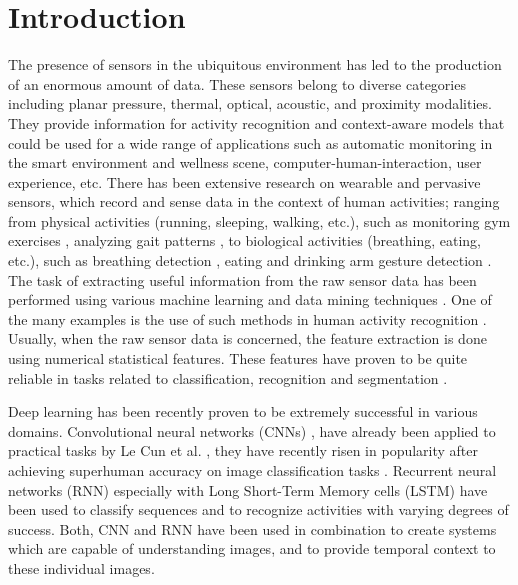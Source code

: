 \section{Introduction}
The presence of sensors in the ubiquitous environment has led to the production of an enormous amount of data. These sensors belong to diverse categories including planar pressure, thermal, optical, acoustic, and proximity modalities. 
They provide information for activity recognition and context-aware models that could be used for a wide range of applications such as automatic monitoring in the smart environment and wellness scene, computer-human-interaction, user experience, etc. 
There has been extensive research on wearable and pervasive sensors, which record and sense data in the context of human activities; ranging from physical activities (running, sleeping, walking, etc.), such as  monitoring gym exercises \cite{zhou2016never}, analyzing gait patterns \cite{tao2012gait}, to biological activities (breathing, eating, etc.), such as breathing detection \cite{corbishley2008breathing}, eating \cite{cheng2010active} and drinking arm gesture detection \cite{amft2005detection}. The task of extracting useful information from the raw sensor data has been performed using various machine learning and data mining techniques \cite{banaee2013data}. One of the many examples is the use of such methods in human activity recognition \cite{maurer2006activity}. Usually, when the raw sensor data is concerned, the feature extraction is done using numerical statistical features. These features have proven to be quite reliable in tasks related to classification, recognition and segmentation \cite{cheng2013smart}. 
\par

Deep learning has been recently proven to be extremely successful in various domains. Convolutional neural networks (CNNs) \cite{fukushima1979neural}, have already been applied to practical tasks by Le Cun et al. \cite{le1990handwritten}, they have recently risen in popularity after achieving superhuman accuracy on image classification tasks \cite{krizhevsky2012imagenet,he2015deep,zhang2016polynet,szegedy2016inception}. Recurrent neural networks (RNN) especially with Long Short-Term Memory cells (LSTM) \cite{hochreiter1997long} have been used to classify sequences \cite{graves2008unconstrained} and to recognize activities \cite{donahue2015long, du2015hierarchical} with varying degrees of success. Both, CNN and RNN have been used in combination to create systems which are capable of understanding images, and to provide temporal context to these individual images. 

